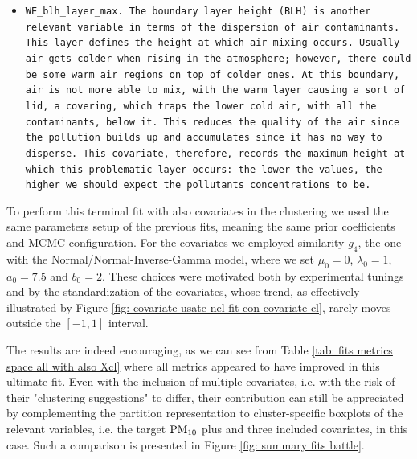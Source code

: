\documentclass[12pt,	%
	a4paper,		%
	twoside,		%
	openright,		%
	titlepage,%
	]{book}
\theoremstyle{definition}
\begin{document}
\begin{itemize}
    \item \tt{WE\_blh\_layer\_max}. The boundary layer height (BLH) is another relevant variable in terms of the dispersion of air contaminants. This layer defines the height at which air mixing occurs. Usually air gets colder when rising in the atmosphere; however, there could be some warm air regions on top of colder ones. At this boundary, air is not more able to mix, with the warm layer causing a sort of lid, a covering, which traps the lower cold air, with all the contaminants, below it. This reduces the quality of the air since the pollution builds up and accumulates since it has no way to disperse. This covariate, therefore, records the maximum height at which this problematic layer occurs: the lower the values, the higher we should expect the pollutants concentrations to be.
\end{itemize}




To perform this terminal fit with also covariates in the clustering we used the same parameters setup of the previous fits, meaning the same prior coefficients and MCMC configuration. For the covariates we employed similarity $g_4$, the one with the Normal/Normal-Inverse-Gamma model, where we set $\mu_0 =0$, $\lambda_0=1$, $a_0 = 7.5$ and $b_0 = 2$. These choices were motivated both by experimental tunings and by the standardization of the covariates, whose trend, as effectively illustrated by Figure \ref{fig: covariate usate nel fit con covariate cl}, rarely moves outside the $[-1,1]$ interval.



The results are indeed encouraging, as we can see from Table \ref{tab: fits metrics space all with also Xcl} where all metrics appeared to have improved in this ultimate fit. Even with the inclusion of multiple covariates, i.e. with the risk of their "clustering suggestions" to differ, their contribution can still be appreciated by complementing the partition representation to cluster-specific boxplots of the relevant variables, i.e. the target $\text{PM}_{10}$ plus and three included covariates, in this case. Such a comparison is presented in Figure \ref{fig: summary fits battle}.
\end{document}
